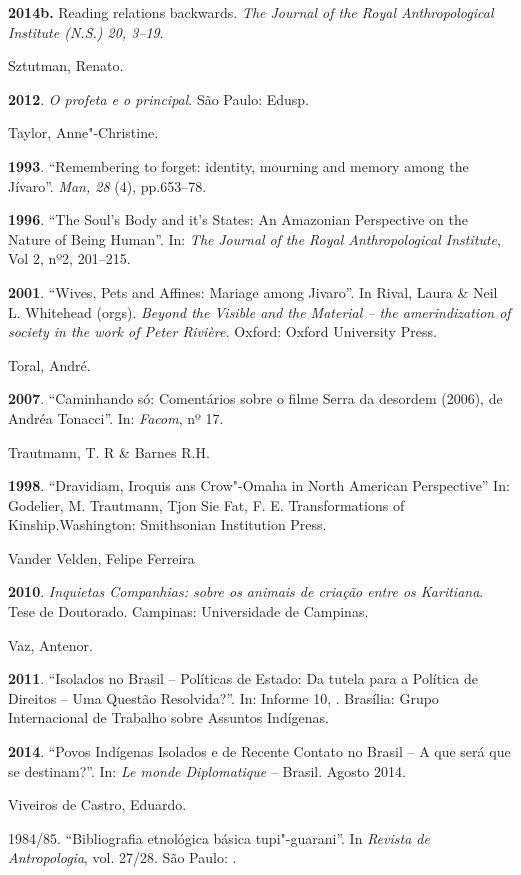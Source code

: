 \textbf{2014b.} Reading relations backwards. \emph{The Journal of the
Royal Anthropological Institute (N.S.) 20, 3--19}.

Sztutman, Renato.

\textbf{2012}. \emph{O profeta e o principal}. São Paulo: Edusp.

Taylor, Anne"-Christine.

\textbf{1993}. ``Remembering to forget: identity, mourning and memory
among the Jívaro''. \emph{Man, 28} (4), pp.653--78.

\textbf{1996}. ``The Soul's Body and it's States: An Amazonian
Perspective on the Nature of Being Human''. In: \emph{The} \emph{Journal}
\emph{of the Royal Anthropological Institute}, Vol 2, nº2, 201--215.

\textbf{2001}. ``Wives, Pets and Affines: Mariage among Jivaro''. In
Rival, Laura \& Neil L. Whitehead (orgs). \emph{Beyond the Visible and
the Material -- the amerindization of society in the work of Peter
Rivière.} Oxford: Oxford University Press.

Toral, André.

\textbf{2007}. ``Caminhando só: Comentários sobre o filme Serra da
desordem (2006), de Andréa Tonacci''. In: \emph{Facom}, nº 17.

Trautmann, T. R \& Barnes R.H.

\textbf{1998}. ``Dravidiam, Iroquis ans Crow"-Omaha in North American
Perspective'' In: Godelier, M. Trautmann, Tjon Sie Fat, F. E.
Transformations of Kinship.Washington: Smithsonian Institution Press.

Vander Velden, Felipe Ferreira

\textbf{2010}. \emph{Inquietas Companhias: sobre os animais de criação
entre os Karitiana}. Tese de Doutorado. Campinas: Universidade de
Campinas.

Vaz, Antenor.

\textbf{2011}. ``Isolados no Brasil -- Políticas de Estado: Da tutela
para a Política de Direitos -- Uma Questão Resolvida?''. In: Informe 10,
. Brasília: Grupo Internacional de Trabalho sobre Assuntos
Indígenas.

\textbf{2014}. ``Povos Indígenas Isolados e de Recente Contato no Brasil
-- A que será que se destinam?''. In: \emph{Le monde Diplomatique} --
Brasil. Agosto 2014.

Viveiros de Castro, Eduardo.

1984/85. ``Bibliografia etnológica básica tupi"-guarani''. In
\emph{Revista de Antropologia}, vol. 27/28. São Paulo: .

